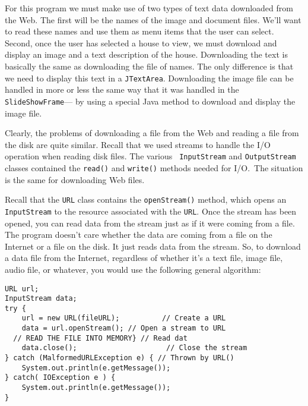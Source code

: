 {For this program we must make use of two types of text data downloaded from
the Web.  The first will be the names of the image and document files.
We'll want to read these names and use them as menu items that the
user can select.  Second, once the user has selected a house to view,
we must download and display an image and a text description of the
house.  Downloading the text is basically the same as downloading the
file of names.  The only difference is that we need to display this
text in a {\tt JTextArea}.  Downloading the image file can be handled
in more or less the same way that it was handled in the {\tt
SlideShowFrame}--- by using a special Java method to download and
display the image file.

Clearly, the problems of downloading a file from the Web and reading a
file from the disk are quite similar.  Recall that we used streams to
handle the I/O operation when reading disk files.  The various {\tt
InputStream} and {\tt OutputStream} classes contained the {\tt read()}
and {\tt write()} methods needed for I/O.~The situation is the same
for downloading Web files.

Recall that the {\tt URL} class contains the {\tt openStream()}
method, which opens an {\tt InputStream} to the resource associated
with the {\tt URL}. Once the stream has been opened, you can read data
from the stream just as if it were coming from a file.  The program
doesn't care whether the data are coming from a file on the Internet or
a file on the disk.  It just reads data from the stream.  So, to
download a data file from the Internet, regardless of whether it's a
text file, image file, audio file, or whatever, you would use the
following general algorithm:

\begin{jjjlisting}
\begin{lstlisting}
URL url;
InputStream data;
try {
    url = new URL(fileURL);          // Create a URL
    data = url.openStream(); // Open a stream to URL
  // READ THE FILE INTO MEMORY} // Read dat
    data.close();                     // Close the stream
} catch (MalformedURLException e) { // Thrown by URL()
    System.out.println(e.getMessage());
} catch( IOException e ) { 
    System.out.println(e.getMessage());
}
\end{lstlisting}
\end{jjjlisting}

}
